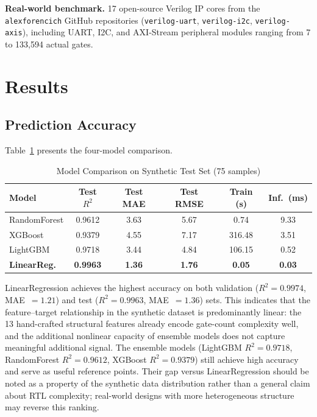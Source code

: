 \documentclass[conference]{IEEEtran}
\begin{document}
\textbf{Real-world benchmark.} 17 open-source Verilog IP cores from the
\texttt{alexforencich} GitHub repositories (\texttt{verilog-uart},
\texttt{verilog-i2c}, \texttt{verilog-axis}), including UART, I2C, and
AXI-Stream peripheral modules ranging from 7 to 133{,}594 actual gates.

\section{Results}

\subsection{Prediction Accuracy}

Table~\ref{tab:model_comparison} presents the four-model comparison.

\begin{table}[t]
\centering
\caption{Model Comparison on Synthetic Test Set (75 samples)}
\label{tab:model_comparison}
\footnotesize
\setlength{\tabcolsep}{3pt}
\begin{tabular}{@{}lccccc@{}}

\toprule
\textbf{Model} & \textbf{Test $R^2$} & \textbf{Test MAE} & \textbf{Test RMSE} & \textbf{Train (s)} & \textbf{Inf.\ (ms)} \\
\midrule
RandomForest & 0.9612 & 3.63 & 5.67 & 0.74 & 9.33 \\
XGBoost      & 0.9379 & 4.55 & 7.17 & 316.48 & 3.51 \\
LightGBM     & 0.9718 & 3.44 & 4.84 & 106.15 & 0.52 \\
\textbf{LinearReg.} & \textbf{0.9963} & \textbf{1.36} & \textbf{1.76} & \textbf{0.05} & \textbf{0.03} \\
\bottomrule
\end{tabular}
\end{table}

LinearRegression achieves the highest accuracy on both validation
($R^2 = 0.9974$, MAE~$= 1.21$) and test ($R^2 = 0.9963$, MAE~$= 1.36$)
sets. This indicates that the feature--target relationship in the
synthetic dataset is predominantly linear: the 13 hand-crafted structural
features already encode gate-count complexity well, and the additional
nonlinear capacity of ensemble models does not capture meaningful additional
signal. The ensemble models (LightGBM $R^2 = 0.9718$, RandomForest
$R^2 = 0.9612$, XGBoost $R^2 = 0.9379$) still achieve high accuracy and
serve as useful reference points. Their gap versus LinearRegression should
be noted as a property of the synthetic data distribution rather than a
general claim about RTL complexity; real-world designs with more
heterogeneous structure may reverse this ranking.
\end{document}
